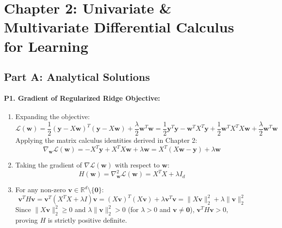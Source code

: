 \section*{Chapter 2: Univariate \& Multivariate Differential Calculus for Learning}

\subsection*{Part A: Analytical Solutions}

\paragraph{P1. Gradient of Regularized Ridge Objective:}
\begin{enumerate}[label=(\alph*)]
    \item Expanding the objective:
    \begin{equation*}
    \mathcal{L}(\mathbf{w}) = \frac{1}{2}(\mathbf{y} - X\mathbf{w})^T (\mathbf{y} - X\mathbf{w}) + \frac{\lambda}{2}\mathbf{w}^T \mathbf{w} = \frac{1}{2}\mathbf{y}^T \mathbf{y} - \mathbf{w}^T X^T \mathbf{y} + \frac{1}{2}\mathbf{w}^T X^T X \mathbf{w} + \frac{\lambda}{2}\mathbf{w}^T \mathbf{w}
    \end{equation*}
    Applying the matrix calculus identities derived in Chapter 2:
    \begin{equation*}
    \nabla_{\mathbf{w}} \mathcal{L}(\mathbf{w}) = -X^T \mathbf{y} + X^T X \mathbf{w} + \lambda \mathbf{w} = X^T (X\mathbf{w} - \mathbf{y}) + \lambda \mathbf{w}
    \end{equation*}
    \item Taking the gradient of $\nabla \mathcal{L}(\mathbf{w})$ with respect to $\mathbf{w}$:
    \begin{equation*}
    H(\mathbf{w}) = \nabla^2_{\mathbf{w}} \mathcal{L}(\mathbf{w}) = X^T X + \lambda I_d
    \end{equation*}
    \item For any non-zero $\mathbf{v} \in \mathbb{R}^d \setminus \{\mathbf{0}\}$:
    \begin{equation*}
    \mathbf{v}^T H \mathbf{v} = \mathbf{v}^T (X^T X + \lambda I)\mathbf{v} = (X\mathbf{v})^T (X\mathbf{v}) + \lambda \mathbf{v}^T \mathbf{v} = \|X\mathbf{v}\|_2^2 + \lambda \|\mathbf{v}\|_2^2
    \end{equation*}
    Since $\|X\mathbf{v}\|_2^2 \ge 0$ and $\lambda \|\mathbf{v}\|_2^2 > 0$ (for $\lambda > 0$ and $\mathbf{v} \ne \mathbf{0}$), $\mathbf{v}^T H \mathbf{v} > 0$, proving $H$ is strictly positive definite.
\end{enumerate}

